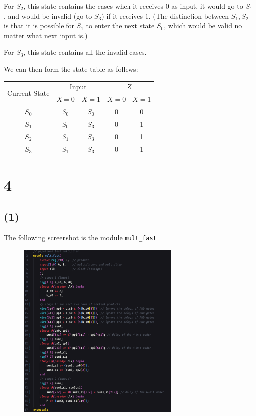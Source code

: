 \documentclass{article}
\begin{document}
For $S_2$, this state contains the cases when it receives $0$ as input, it would go to $S_1$, and would be invalid (go to $S_3$) if it receives $1$. (The distinction between $S_1, S_2$ is that it is possible for $S_1$ to enter the next state $S_0$, which would be valid no matter what next input is.)
\bigskip

For $S_3$, this state contains all the invalid cases. 
\bigskip

We can then form the state table as follows:

\begin{table}[H]
    \centering
    \begin{tabular}{|c||c|c||c|c|}
        \hline
        \multirow{2}{*}{Current State} & \multicolumn{2}{c||}{Input} & \multicolumn{2}{c|}{$Z$} \\
        \cline{2-5}
        & $X = 0$ & $X = 1$ & $X = 0$ & $X = 1$ \\
        \hline
        $S_0$ & $S_0$ & $S_0$ & 0 & 0 \\
        \hline
        $S_1$ & $S_0$ & $S_3$ & 0 & 1 \\
        \hline
        $S_2$ & $S_1$ & $S_3$ & 0 & 1 \\
        \hline
        $S_3$ & $S_1$ & $S_3$ & 0 & 1 \\
        \hline
    \end{tabular}
\end{table}


\newpage

\section*{4}

\subsection*{(1)}

The following screenshot is the module \lstinline{mult_fast}

\begin{figure}[H]
    \centering
    \includegraphics[width=0.7\textwidth]{4_1.png}
\end{figure}
\end{document}
